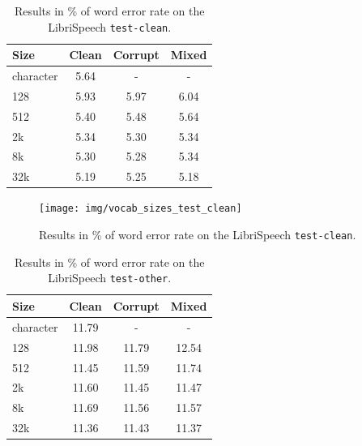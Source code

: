 \begin{table}[p]
	\centering
	\begin{tabular}{l|ccc}
		\bf Size & \bf Clean & \bf Corrupt & \bf Mixed \\
		\hline
		
		character    &    5.64    &    -    &    - \\
		128    &    5.93    &    5.97    &    6.04 \\
		512    &    5.40    &    5.48    &    5.64 \\
		2k    &    5.34    &    5.30    &    5.34 \\
		8k    &    5.30    &    5.28    &    5.34 \\
		32k    &    5.19    &    5.25    &    5.18 \\
		
	\end{tabular}
	
	\caption{Results in \% of word error rate on the LibriSpeech \texttt{test-clean}.}
	\label{tab:results_vocabularies_libri_clean}
\end{table}

\begin{figure}[p]
	\centering
	\texttt{[image: img/vocab\_sizes\_test\_clean]}
	\caption{Results in \% of word error rate on the LibriSpeech \texttt{test-clean}.}
	\label{fig:vocab_sizes_test_clean}
\end{figure}

\begin{table}[p]
	\centering
	\begin{tabular}{l|ccc}
		\bf Size & \bf Clean & \bf Corrupt & \bf Mixed \\
		\hline
		character    &    11.79    &    -    &    - \\
		128    &    11.98    &    11.79    &    12.54\\
		512    &    11.45    &    11.59    &    11.74\\
		2k    &    11.60    &    11.45    &    11.47\\
		8k    &    11.69    &    11.56    &    11.57\\
		32k    &    11.36    &    11.43    &    11.37\\
		
	\end{tabular}
	
	\caption{Results in \% of word error rate on the LibriSpeech \texttt{test-other}.}
	\label{tab:results_vocabularies_libri_other}
\end{table}

